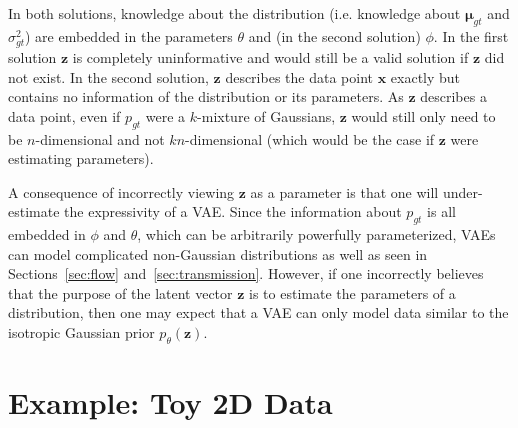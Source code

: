 \documentclass{article}
\begin{document}
In both solutions, knowledge about the distribution (i.e. knowledge about $\boldsymbol \mu_{gt}$ and $\sigma^2_{gt}$) are embedded in the parameters $\theta$ and (in the second solution) $\phi$. In the first solution $\mathbf{z}$ is completely uninformative and would still be a valid solution if $\mathbf{z}$ did not exist. 
In the second solution, $\mathbf{z}$ describes the data point $\mathbf{x}$ exactly but contains no information of the distribution or its parameters. As  $\mathbf{z}$ describes a data point, even if $p_{gt}$ were a $k$-mixture of Gaussians, $\mathbf{z}$ would still only need to be $n$-dimensional and not $kn$-dimensional (which would be the case if $\mathbf{z}$ were estimating parameters).

A consequence of incorrectly viewing $\mathbf{z}$ as a parameter is that one will under-estimate the expressivity of a VAE.
Since the information about $p_{gt}$ is all embedded in $\phi$ and $\theta$, which can be arbitrarily powerfully parameterized, VAEs can model complicated non-Gaussian distributions as well as seen in Sections~\ref{sec:flow} and~\ref{sec:transmission}. However, if one incorrectly believes that the purpose of the latent vector $\mathbf{z}$ is to estimate the parameters of a distribution, then one may expect that a VAE can only model data similar to the isotropic Gaussian prior $p_\theta(\mathbf{z})$.

\section{Example: Toy 2D Data}
\label{sec:code}
\end{document}
